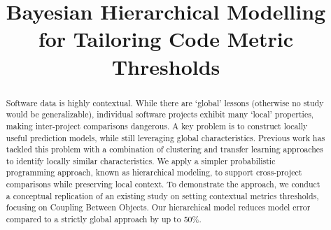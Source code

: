 \documentclass[sigconf,natbib=false]{acmart}
\begin{document}
\title{Bayesian Hierarchical Modelling for Tailoring Code Metric Thresholds} %



\begin{abstract}
Software data is highly contextual. While there are ‘global’ lessons (otherwise no study would be generalizable), individual software projects exhibit many ‘local’ properties, making inter-project comparisons dangerous. A key problem is to construct locally useful prediction models, while still leveraging global characteristics. Previous work has tackled this problem with a combination of clustering and transfer learning approaches to identify locally similar characteristics. We apply a simpler probabilistic programming approach, known as hierarchical modeling, to support cross-project comparisons while preserving local context. To demonstrate the approach, we conduct a conceptual replication of an existing study on setting contextual metrics thresholds, focusing on Coupling Between Objects. Our hierarchical model reduces model error compared to a strictly global approach by up to 50\%.\end{abstract}

%



\maketitle
\end{document}
